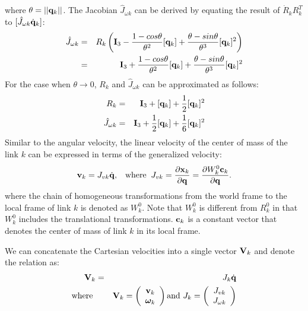 where $\theta = ||\mathbf{q}_k ||$. The Jacobian $\hat{J}_{\omega k}$ can be derived by equating the result of $\dot{R}_k R_k^T$ to $[\hat{J}_{\omega k} \dot{\mathbf{q}}_k]$:
\begin{eqnarray}
\nonumber
\hat{J}_{\omega k} & = & R_k \left ( \mathbf{I}_3 - \frac{1-cos\theta}{\theta^2}[\mathbf{q}_k] + \frac{\theta - sin \theta}{\theta^3} [\mathbf{q}_k]^2 \right )\\
 & = & \mathbf{I}_3 + \frac{1-cos\theta}{\theta^2}[\mathbf{q}_k] + \frac{\theta - sin \theta}{\theta^3} [\mathbf{q}_k]^2
\end{eqnarray}
For the case when $\theta \rightarrow 0$, $R_k$ and $\hat{J}_{\omega k}$ can be approximated as follows:
\begin{eqnarray}
R_k & = & \mathbf{I}_3 + [{\mathbf{q}}_k] + \frac{1}{2}[{\mathbf{q}}_k]^2\\
\hat{J}_{\omega k} & = & \mathbf{I}_3 + \frac{1}{2}[{\mathbf{q}}_k] + \frac{1}{6}[{\mathbf{q}}_k]^2
\end{eqnarray}
Similar to the angular velocity, the linear velocity of the center of mass of the link $k$
can be expressed in terms of the generalized velocity: 
\begin{equation}
\label{eq:linear_velocity_link}
\mathbf{v}_k = J_{vk} \dot{\mathbf{q}}, \;\;\;\mathrm{where}\;\; J_{vk} = \frac{\partial \mathbf{x}_k}{\partial \mathbf{q}}=  \frac{\partial W^0_k
  \mathbf{c}_k}{\partial \mathbf{q}}.
\end{equation}
where the chain of homogeneous transformations from the world frame to the local
frame of link $k$ is denoted as $W^0_k$. Note that $W^0_k$ is
different from $R^0_k$ in that $W^0_k$ includes the translational
transformations. $\mathbf{c}_k$ is a constant vector that denotes the center of mass of link $k$ in
its local frame.

We can concatenate the Cartesian velocities into a single vector $\mathbf{V}_k$ and denote the relation as:
\begin{eqnarray}
\label{eq:vel_relation_link}
\nonumber
\mathbf{V}_k & = & {J}_k \dot{\mathbf{q}}\\
\mbox{where } & & 
\mathbf{V}_k = \left (
\begin{array}{c}
\mathbf{v}_k\\
\bm{\omega}_k
\end{array}
\right ) \mbox{and\ }
{J}_k = \left (
\begin{array}{c}
J_{vk}\\
J_{\omega k}
\end{array}
\right ) 
\end{eqnarray}


